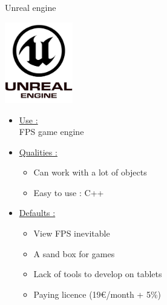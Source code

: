 \documentclass[a4paper,10pt]{beamer}
\begin{document}
			\begin{frame}{Unreal engine}
				\begin{multicols}{2}
				\includegraphics[height=100pt]{images/logos/Unreal_Engine.png}\\
				
				\columnbreak 
				
				 \begin{itemize}
				 	\item \underline{Use :}\\		
					 FPS game engine	 
					 \item \underline{Qualities :}\\
						 \begin{itemize}
						 	\item Can work with a lot of objects
						 	\item Easy to use : C++
						 \end{itemize}
				 \end{itemize}		 
				\end{multicols}
				\begin{itemize}
					\item \underline{Defaults :}\\
					\begin{itemize}
						\item View FPS inevitable
						\item A sand box for games
						\item Lack of tools to develop on tablets
						\item Paying licence (19\euro/month + 5\%)
					\end{itemize}
				\end{itemize}
			\end{frame}
			
\end{document}
